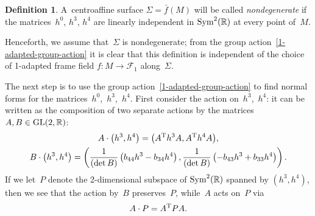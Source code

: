 \documentclass[10pt,a4paper]{amsart}
\numberwithin{equation}{section}
\theoremstyle{definition}
\newtheorem{dfn}[teo]{Definition}
\begin{document}
\begin{dfn}
\label{nondegenerate-def}
A~centroaf\/f\/ine surface $\Sigma = \bar{f}(M)$ will be called {\em nondegenerate} if the matri\-ces~$h^0$, $h^3$, $h^4$ are
linearly independent in ${\rm Sym}^2(\mathbb{R})$ at every point of~$M$.
\end{dfn}

Henceforth, we assume that~$\Sigma$ is nondegenerate; from the group action~\eqref{1-adapted-group-action} it is clear
that this def\/inition is independent of the choice of 1-adapted frame f\/ield $f:M \to \mathcal{F}_1$ along~$\Sigma$.

The next step is to use the group action~\eqref{1-adapted-group-action} to f\/ind normal forms for the matri\-ces~$h^0$,~$h^3$,~$h^4$.
First consider the action on~$h^3$,~$h^4$: it can be written as the composition of two separate actions by the matrices
$A,B \in {\rm GL}(2, \mathbb{R})$:
\begin{gather*}
A\cdot \big(h^3, h^4\big)=\big(A^{\rm T} h^3 A, A^{\rm T} h^4 A\big),
\\
B \cdot \big(h^3, h^4\big)=\left(\frac{1}{(\det B)} \left(b_{44} h^3 - b_{34} h^4 \right), \frac{1}{(\det
B)}\left(-b_{43} h^3 + b_{33} h^4 \right)\right).
\end{gather*}
If we let~$P$ denote the 2-dimensional subspace of ${\rm Sym}^2(\mathbb{R})$ spanned by $(h^3, h^4)$, then we see that
the action by~$B$ preserves~$P$, while~$A$ acts on~$P$ via
\begin{gather}
A\cdot P = A^{\rm T} P A.
\label{plane-action}
\end{gather}
\end{document}
